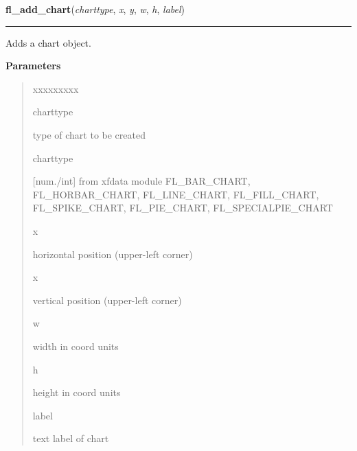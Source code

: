     \label{xformslib:flchart:fl_add_chart}

    \vspace{0.5ex}

\hspace{.8\funcindent}\begin{boxedminipage}{\funcwidth}

    \raggedright \textbf{fl\_add\_chart}(\textit{charttype}, \textit{x}, \textit{y}, \textit{w}, \textit{h}, \textit{label})

    \vspace{-1.5ex}

    \rule{\textwidth}{0.5\fboxrule}
\setlength{\parskip}{2ex}
    Adds a chart object.

\setlength{\parskip}{1ex}
      \textbf{Parameters}
      \vspace{-1ex}

      \begin{quote}
        \begin{Ventry}{xxxxxxxxx}

          \item[charttype]

          type of chart to be created

          \item[charttype]

          [num./int] from xfdata module FL\_BAR\_CHART, FL\_HORBAR\_CHART, 
          FL\_LINE\_CHART, FL\_FILL\_CHART, FL\_SPIKE\_CHART, 
          FL\_PIE\_CHART, FL\_SPECIALPIE\_CHART

          \item[x]

          horizontal position (upper-left corner)

          \item[x]

          vertical position (upper-left corner)

          \item[w]

          width in coord units

          \item[h]

          height in coord units

          \item[label]

          text label of chart


\end{Ventry}
\end{quote}
\end{boxedminipage}

